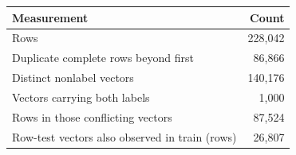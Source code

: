 \centering\footnotesize
\begin{tabular}{@{}p{4.55cm}r@{}}
\toprule
Measurement & Count\\\midrule
Rows & 228,042\\
Duplicate complete rows beyond first & 86,866\\
Distinct nonlabel vectors & 140,176\\
Vectors carrying both labels & 1,000\\
Rows in those conflicting vectors & 87,524\\
Row-test vectors also observed in train (rows) & 26,807\\
\bottomrule
\end{tabular}
